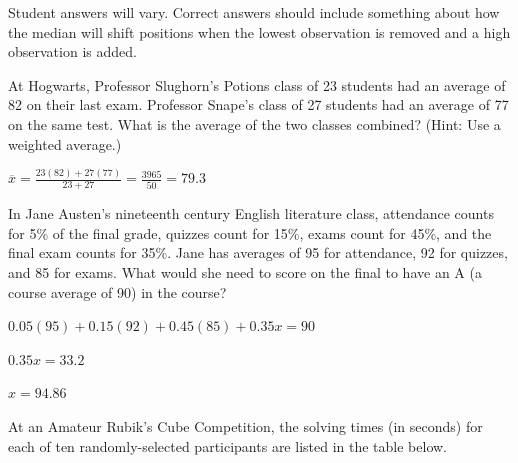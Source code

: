 \documentclass[noanswers]{exam}
\begin{document}
\begin{questions}
\begin{solution}[\stretch{1}]
			Student answers will vary. Correct answers should include something about how the median will shift positions when the lowest observation is removed and a high observation is added.

			\vspace{3mm}		
			
		\end{solution}
		
	\question At Hogwarts, Professor Slughorn's Potions class of 23 students had an average of 82 on their last exam. Professor Snape's class of 27 students had an average of 77 on the same test. What is the average of the two classes combined? (Hint: Use a weighted average.)
	
	\begin{solution}[\stretch{1}]
	
	\vspace{3mm}
	
	$\displaystyle \overline{x}=\frac{23(82)+27(77)}{23+27}=\frac{3965}{50}=79.3$
	
	\vspace{3mm}
	
	\end{solution}
	
	\question In Jane Austen's nineteenth century English literature class, attendance counts for 5\% of the final grade, quizzes count for 15\%, exams count for 45\%, and the final exam counts for 35\%. Jane has averages of 95 for attendance, 92 for quizzes, and 85 for exams. What would she need to score on the final to have an A (a course average of 90) in the course?
	
	\begin{solution}[\stretch{1}]
	
			\vspace{3mm}
			
			$0.05(95)+0.15(92)+0.45(85)+0.35x=90$
			
			\vspace{3mm}
			
			$0.35x=33.2$

			\vspace{3mm}	
			
			$x=94.86$	
			
		\end{solution}
		
	\newpage
	
	\question At an Amateur Rubik's Cube Competition, the solving times (in seconds) for each of ten randomly-selected participants are listed in the table below. 
	

\end{questions}
\end{document}
